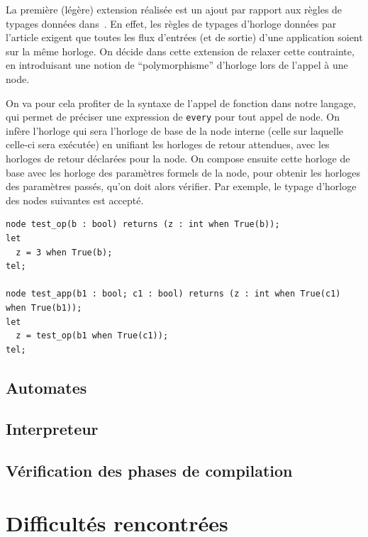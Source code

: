 \documentclass{article}
\begin{document}
La première (légère) extension réalisée est un ajout par rapport aux règles de typages données dans~\cite{Biernacki08}. En effet, les règles de typages d'horloge données par l'article exigent que toutes les flux d'entrées (et de sortie) d'une application soient sur la même horloge. On décide dans cette extension de relaxer cette contrainte, en introduisant une notion de ``polymorphisme'' d'horloge lors de l'appel à une node.

On va pour cela profiter de la syntaxe de l'appel de fonction dans notre langage, qui permet de préciser une expression de \texttt{every} pour tout appel de node. On infère l'horloge qui sera l'horloge de base de la node interne (celle sur laquelle celle-ci sera exécutée) en unifiant les horloges de retour attendues, avec les horloges de retour déclarées pour la node. On compose ensuite cette horloge de base avec les horloge des paramètres formels de la node, pour obtenir les horloges des paramètres passés, qu'on doit alors vérifier. Par exemple, le typage d'horloge des nodes suivantes est accepté.

\begin{lstlisting}
node test_op(b : bool) returns (z : int when True(b));
let
  z = 3 when True(b);
tel;

node test_app(b1 : bool; c1 : bool) returns (z : int when True(c1) when True(b1));
let
  z = test_op(b1 when True(c1));
tel;
\end{lstlisting}

\subsection{Automates}

\subsection{Interpreteur}
\label{interpreter}

\subsection{Vérification des phases de compilation}
\label{compilVerif}

\cite{Colaco05}

\section{Difficultés rencontrées}

{}

\end{document}
